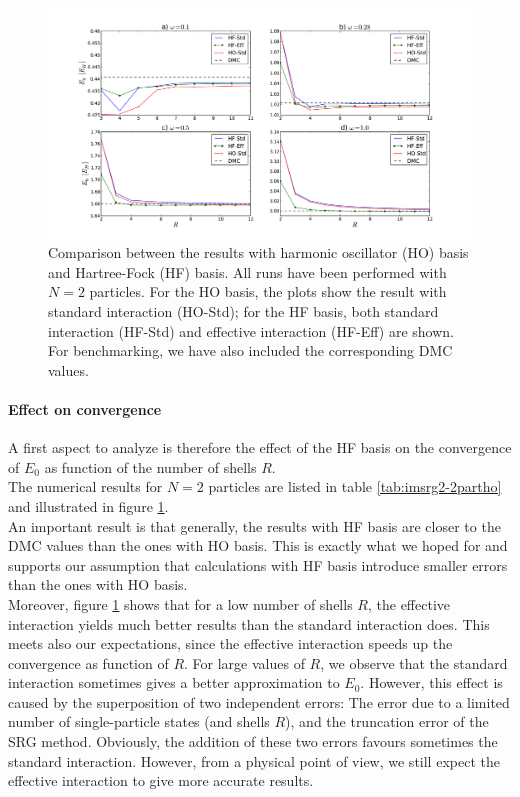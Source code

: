 \begin{figure}
\begin{center}
\includegraphics[scale=0.42]{../Plots/convergence1.pdf}
\end{center}
\caption{Comparison between the results with harmonic oscillator (HO) basis and Hartree-Fock (HF) basis. All runs have been performed with $N=2$ particles. For the HO basis, the plots show the result with standard interaction (HO-Std); for the HF basis, both standard interaction (HF-Std) and effective interaction (HF-Eff) are shown. For benchmarking, we have also included the corresponding DMC values.}
\label{fig:convergence1}
\end{figure}

\paragraph{Effect on convergence}
A first aspect to analyze is therefore the effect of the HF basis on the convergence of $E_0$ as function of the number of shells $R$.\\
The numerical results for $N=2$ particles are listed in table \ref{tab:imsrg2-2partho} and illustrated in figure \ref{fig:convergence1}. \\
An important result is that generally, the results with HF basis are closer to the DMC values than the ones with HO basis. This is exactly what we hoped for and supports our assumption that calculations with HF basis introduce  smaller errors than the ones with HO basis. \\
Moreover, figure \ref{fig:convergence1} shows that for a low number of shells $R$, the effective interaction yields much better results than the standard interaction does. This meets also our expectations, since the effective interaction speeds up  the convergence as function of $R$. For large values of $R$, we observe that the standard interaction sometimes gives a better approximation to $E_0$. However, this effect is caused by the superposition of two independent errors: The error due to a limited number of single-particle states (and shells $R$), and the truncation error of the SRG method. Obviously, the addition of these two errors favours sometimes the standard interaction. However, from a physical point of view, we still expect the effective interaction to give more accurate results.

